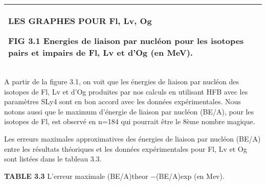 \documentclass[a4paper]{article}
\begin{document}
\begin{flushleft}
\tablefirsthead{}
\tablehead{}
\tabletail{}
\tablelasttail{}
\begin{supertabular}{|m{6.27126in}|}
\hline
{\begin{french}\bfseries  LES GRAPHES POUR  Fl, Lv, Og\end{french}}

{\begin{french} FIG 3.1 Energies de liaison par nucléon pour les isotopes pairs et impairs de Fl, Lv et d’Og (en MeV).\end{french}}\\\hline
\end{supertabular}
\end{flushleft}
 A partir de la figure 3.1, on voit que les énergies de liaison par nucléon des isotopes de Fl, Lv et d’Og produites par nos calculs en utilisant HFB avec les paramètres SLy4 sont en bon accord avec les données expérimentales. Nous notons aussi que le maximum d’énergie de liaison par nucléon (BE/A), pour les isotopes de  Fl, est observé en n=184 qui pourrait être le 8ème nombre magique.

 Les erreurs maximales approximatives des énergies de liaison par nucléon (BE/A) entre les résultats théoriques et les données expérimentales pour Fl, Lv et Og sont listées dans le tableau 3.3.

 \textenglish{\textbf{TABLE 3.3}}\textenglish{ L’erreur maximale (BE/A)theor −(BE/A)exp (en Mev).}
\end{document}
